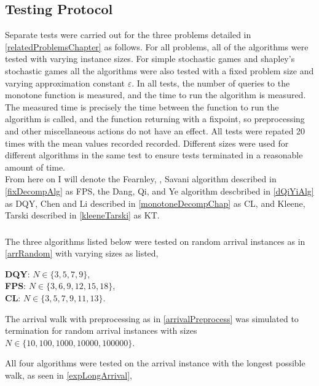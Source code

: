 \subsection{Testing Protocol}
Separate tests were carried out for the three problems detailed in \cref{relatedProblemsChapter} as follows.
For all problems, all of the algorithms were tested with varying instance sizes. For simple stochastic games
and shapley's stochastic games all the algorithms were also tested with a fixed problem size and varying
approximation constant $\varepsilon$. In all tests, the number of queries to the monotone function is
measured, and the time to run the algorithm is measured. The measured time is precisely the time between
the function to run the algorithm is called, and the function returning with a fixpoint, so preprocessing
and other miscellaneous actions do not have an effect. All tests were repated 20 times with the
mean values recorded recorded. Different sizes were used for different algorithms in the same test
to ensure tests terminated in a reasonable amount of time. \\
From here on I will denote the Fearnley, \pav, Savani algorithm described in \cref{fixDecompAlg}
as FPS, the Dang, Qi, and Ye algorithm descbribed in \cref{dQiYiAlg} as
DQY, Chen and Li described in \cref{monotoneDecompChap} as CL, and Kleene, Tarski 
described in \cref{kleeneTarski} as KT.
\subsubsection{\arr}
\begin{test} \label{arrMainTest}
  The three algorithms listed below were tested on random arrival instances as in \cref{arrRandom}
  with varying sizes as listed, 
  \begin{itemize}
      \textbf{DQY}: $N \in \{3, 5, 7, 9\}$, \\
      \textbf{FPS}: $N \in \{3, 6, 9, 12, 15, 18\}$, \\
      \textbf{CL}: $N \in \{3, 5, 7, 9, 11, 13\}$.
  \end{itemize}
\end{test}
\begin{test} \label{arrWalkTest}
  The arrival walk with preprocessing as in \cref{arrivalPreprocess} 
  was simulated to termination for random arrival instances with sizes
  $N \in \{10, 100, 1000, 10000, 100000\}$.
\end{test}
\begin{test} \label{longArrivalTest}
  All four algorithms were tested on the arrival instance with the
  longest possible walk, as seen in \cref{expLongArrival},
\end{test}
